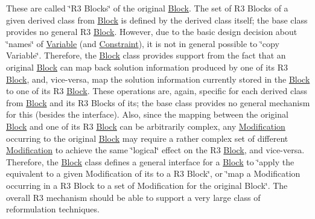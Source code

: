These are called \char`\"{}\+R3 Blocks\char`\"{} of the original \mbox{\hyperlink{class_s_m_spp__di__unipi__it_1_1_block}{Block}}. The set of R3 Blocks of a given derived class from \mbox{\hyperlink{class_s_m_spp__di__unipi__it_1_1_block}{Block}} is defined by the derived class itself; the base class provides no general R3 \mbox{\hyperlink{class_s_m_spp__di__unipi__it_1_1_block}{Block}}. However, due to the basic design decision about \char`\"{}names\char`\"{} of \mbox{\hyperlink{class_s_m_spp__di__unipi__it_1_1_variable}{Variable}} (and \mbox{\hyperlink{class_s_m_spp__di__unipi__it_1_1_constraint}{Constraint}}), it is not in general possible to \char`\"{}copy Variable\char`\"{}. Therefore, the \mbox{\hyperlink{class_s_m_spp__di__unipi__it_1_1_block}{Block}} class provides support from the fact that an original \mbox{\hyperlink{class_s_m_spp__di__unipi__it_1_1_block}{Block}} can map back solution information produced by one of its R3 \mbox{\hyperlink{class_s_m_spp__di__unipi__it_1_1_block}{Block}}, and, vice-\/versa, map the solution information currently stored in the \mbox{\hyperlink{class_s_m_spp__di__unipi__it_1_1_block}{Block}} to one of its R3 \mbox{\hyperlink{class_s_m_spp__di__unipi__it_1_1_block}{Block}}. These operations are, again, specific for each derived class from \mbox{\hyperlink{class_s_m_spp__di__unipi__it_1_1_block}{Block}} and its R3 Blocks of its; the base class provides no general mechanism for this (besides the interface). Also, since the mapping between the original \mbox{\hyperlink{class_s_m_spp__di__unipi__it_1_1_block}{Block}} and one of its R3 \mbox{\hyperlink{class_s_m_spp__di__unipi__it_1_1_block}{Block}} can be arbitrarily complex, any \mbox{\hyperlink{class_s_m_spp__di__unipi__it_1_1_modification}{Modification}} occurring to the original \mbox{\hyperlink{class_s_m_spp__di__unipi__it_1_1_block}{Block}} may require a rather complex set of different \mbox{\hyperlink{class_s_m_spp__di__unipi__it_1_1_modification}{Modification}} to achieve the same \char`\"{}logical\char`\"{} effect on the R3 \mbox{\hyperlink{class_s_m_spp__di__unipi__it_1_1_block}{Block}}, and vice-\/versa. Therefore, the \mbox{\hyperlink{class_s_m_spp__di__unipi__it_1_1_block}{Block}} class defines a general interface for a \mbox{\hyperlink{class_s_m_spp__di__unipi__it_1_1_block}{Block}} to \char`\"{}apply the equivalent to a given Modification of
its to a R3 Block\char`\"{}, or \char`\"{}map a Modification occurring in a R3 Block to a
set of Modification for the original Block\char`\"{}. The overall R3 mechanism should be able to support a very large class of reformulation techniques.

